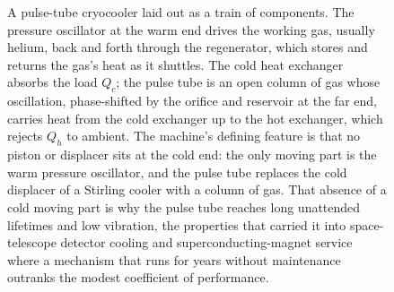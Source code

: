 \begin{figure}[htbp]
\caption[Pulse-tube cryocooler schematic]{A pulse-tube cryocooler laid out as a
train of components. The pressure oscillator at the warm end drives the working
gas, usually helium, back and forth through the regenerator, which stores and
returns the gas's heat as it shuttles. The cold heat exchanger absorbs the load
$Q_c$; the pulse tube is an open column of gas whose oscillation, phase-shifted by
the orifice and reservoir at the far end, carries heat from the cold exchanger up
to the hot exchanger, which rejects $Q_h$ to ambient. The machine's defining
feature is that no piston or displacer sits at the cold end: the only moving part
is the warm pressure oscillator, and the pulse tube replaces the cold displacer of
a Stirling cooler with a column of gas. That absence of a cold moving part is why
the pulse tube reaches long unattended lifetimes and low vibration, the properties
that carried it into space-telescope detector cooling and superconducting-magnet
service where a mechanism that runs for years without maintenance outranks the
modest coefficient of performance.}
\label{fig:vol04ch03:pulse-tube-schematic}
\end{figure}
